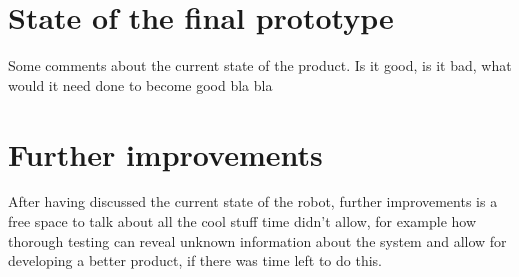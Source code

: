 \section{State of the final prototype}
Some comments about the current state of the product. Is it good, is it bad, what would it need done to become good bla bla
\section{Further improvements}
After having discussed the current state of the robot, further improvements is a free space to talk about all the cool stuff time didn't allow, for example how thorough testing can reveal unknown information about the system and allow for developing a better product, if there was time left to do this.
